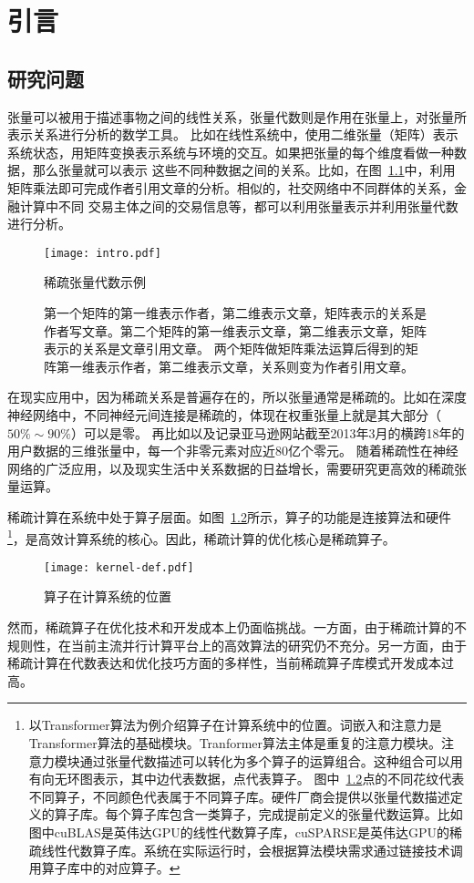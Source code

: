 
\chapter{引言}

\section{研究问题}
张量可以被用于描述事物之间的线性关系，张量代数则是作用在张量上，对张量所表示关系进行分析的数学工具。
比如在线性系统中，使用二维张量（矩阵）表示系统状态，用矩阵变换表示系统与环境的交互。如果把张量的每个维度看做一种数据，那么张量就可以表示
这些不同种数据之间的关系。比如，在图~\ref{fig:intro}中，利用矩阵乘法即可完成作者引用文章的分析。相似的，社交网络中不同群体的关系，金融计算中不同
交易主体之间的交易信息等，都可以利用张量表示并利用张量代数进行分析。
\begin{figure}
  \centering
  \texttt{[image: intro.pdf]}
  \caption{稀疏张量代数示例}
  \caption*{第一个矩阵的第一维表示作者，第二维表示文章，矩阵表示的关系是作者写文章。第二个矩阵的第一维表示文章，第二维表示文章，矩阵表示的关系是文章引用文章。
  两个矩阵做矩阵乘法运算后得到的矩阵第一维表示作者，第二维表示文章，关系则变为作者引用文章。}
  \label{fig:intro}
\end{figure}

在现实应用中，因为稀疏关系是普遍存在的\cite{uzzi2007small}，所以张量通常是稀疏的。比如在深度神经网络中，不同神经元间连接是稀疏的，体现在权重张量上就是其大部分（$50\% \sim 90\%$）可以是零\cite{wang2021dual}。
再比如以及记录亚马逊网站截至2013年3月的横跨18年的用户数据的三维张量中，每一个非零元素对应近80亿个零元\cite{mcauley2013hidden}。
随着稀疏性在神经网络的广泛应用\cite{xiao2022smoothquant}，以及现实生活中关系数据的日益增长，需要研究更高效的稀疏张量运算。

稀疏计算在系统中处于算子层面。如图~\ref{fig:kernel-def}所示，算子的功能是连接算法和硬件  \footnote{以Transformer算法\cite{vaswani2017transformer}为例介绍算子在计算系统中的位置。词嵌入和注意力是Transformer算法的基础模块。Tranformer算法主体是重复的注意力模块。注意力模块通过张量代数描述可以转化为多个算子的运算组合。这种组合可以用有向无环图表示，其中边代表数据，点代表算子。
图中~\ref{fig:kernel-def}点的不同花纹代表不同算子，不同颜色代表属于不同算子库。硬件厂商会提供以张量代数描述定义的算子库。每个算子库包含一类算子，完成提前定义的张量代数运算。比如图中cuBLAS\cite{cuBLAS}是英伟达GPU的线性代数算子库，cuSPARSE\cite{naumov2010cusparse}是英伟达GPU的稀疏线性代数算子库。系统在实际运行时，会根据算法模块需求通过链接技术调用算子库中的对应算子。}，是高效计算系统的核心。因此，稀疏计算的优化核心是稀疏算子。
\begin{figure}
  \centering
  \texttt{[image: kernel-def.pdf]}
  \caption{算子在计算系统的位置}
  \label{fig:kernel-def}
\end{figure}
然而，稀疏算子在优化技术和开发成本上仍面临挑战。一方面，由于稀疏计算的不规则性，在当前主流并行计算平台上的高效算法的研究仍不充分。另一方面，由于稀疏计算在代数表达和优化技巧方面的多样性，当前稀疏算子库模式开发成本过高。

